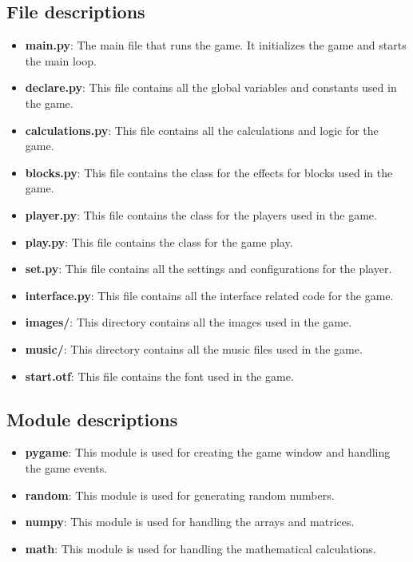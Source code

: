 \documentclass[12pt]{article}
\begin{document}
\subsection{File descriptions}
\begin{itemize}
    \item \textbf{main.py}: The main file that runs the game. It initializes the game and starts the main loop.
    \item \textbf{declare.py}: This file contains all the global variables and constants used in the game.
    \item \textbf{calculations.py}: This file contains all the calculations and logic for the game.
    \item \textbf{blocks.py}: This file contains the class for the effects for blocks used in the game.
    \item \textbf{player.py}: This file contains the class for the players used in the game.
    \item \textbf{play.py}: This file contains the class for the game play.
    \item \textbf{set.py}: This file contains all the settings and configurations for the player.
    \item \textbf{interface.py}: This file contains all the interface related code for the game.
    \item \textbf{images/}: This directory contains all the images used in the game.
    \item \textbf{music/}: This directory contains all the music files used in the game.
    \item \textbf{start.otf}: This file contains the font used in the game.
\end{itemize}

\subsection{Module descriptions}
\begin{itemize}
    \item \textbf{pygame}: This module is used for creating the game window and handling the game events.
    \item \textbf{random}: This module is used for generating random numbers.
    \item \textbf{numpy}: This module is used for handling the arrays and matrices.
    \item \textbf{math}: This module is used for handling the mathematical calculations.
\end{itemize}
\end{document}
